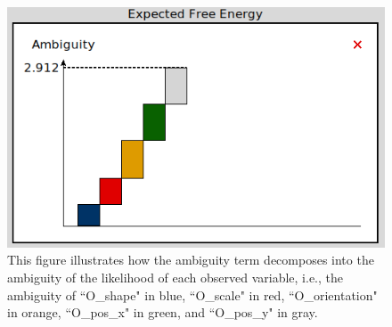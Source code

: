 \documentclass[twoside,11pt]{article}
\begin{document}
\begin{figure}[H]
	\begin{center}
	\includegraphics[scale=0.5]{ambiguity_decomposition.png}
	\end{center}
  \caption{This figure illustrates how the ambiguity term decomposes into the ambiguity of the likelihood of each observed variable, i.e., the ambiguity of ``O\_shape" in blue, ``O\_scale" in red, ``O\_orientation" in orange, ``O\_pos\_x" in green, and ``O\_pos\_y" in gray.}
   \label{fig:ambiguity_decomposition}
\end{figure}
\end{document}
